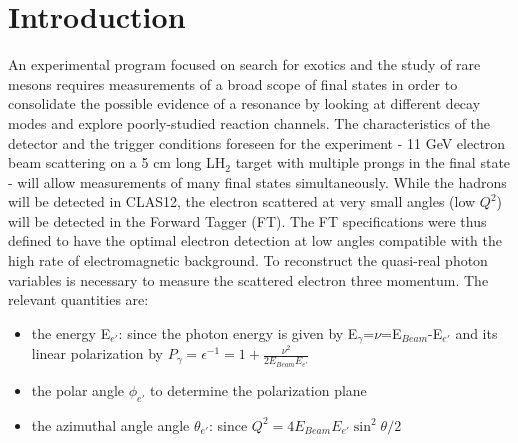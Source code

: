 \section{Introduction}
An experimental program focused on search for exotics and the study of rare mesons requires measurements of a broad scope of final states in order to consolidate the possible evidence of a resonance by looking at different decay modes and explore poorly-studied reaction channels.
The characteristics of the detector and the trigger conditions foreseen for the experiment - 11 GeV electron beam scattering on a 5 cm long LH$_2$ target with multiple prongs in the final state - will allow  measurements of many final states simultaneously. While the hadrons will be detected in CLAS12, the electron scattered at very small angles (low $Q^2$)  will be detected in the Forward Tagger (FT).
The FT  specifications  were thus defined to have the optimal electron detection at low angles compatible with the high rate of electromagnetic background.
To reconstruct the  quasi-real photon variables is necessary to measure the scattered electron three momentum.
The relevant quantities are:
\begin{itemize}
\item the energy E$_{e'}$: since the photon energy is given by E$_\gamma$=$\nu$=E$_{Beam}$-E$_{e'}$ and its linear polarization
 by $P_\gamma=\epsilon^{-1}=1+\frac{\nu^2}{2 E_{Beam} E_{e'}}$
\item the polar angle $\phi_{e'}$ to determine the polarization plane 
\item the azimuthal angle angle $\theta_{e'}$: since $Q^2 = 4 E_{Beam} E_{e'} \sin^2{\theta/2}$
\end{itemize}

